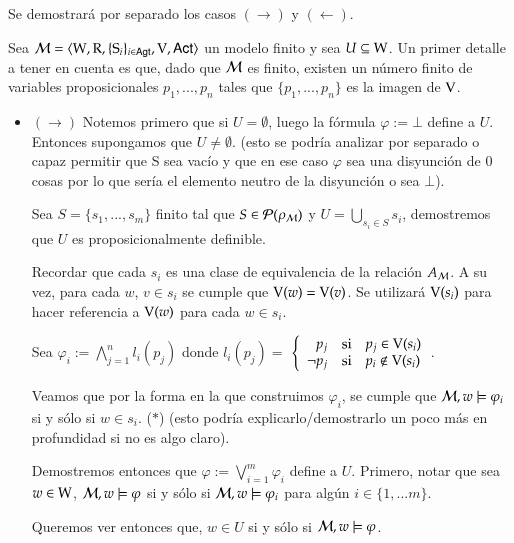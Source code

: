 \begin{demostracion}
    Se demostrará por separado los casos $(\rightarrow)$ y $(\leftarrow)$.

    Sea $\mathcal{M}=\langle \mathrm{W},\mathrm{R},\{ \mathrm{S}_i \}_{i \in {\rm \sf Agt}},\mathrm{V},{\rm \sf Act} \rangle$ un modelo finito y sea $U \subseteq \mathrm{W}$. Un primer detalle a tener en cuenta es que, dado que $\mathcal{M}$ es finito, existen un número finito de variables proposicionales $p_1,...,p_n$ tales que $\{p_1,...,p_n\}$ es la imagen de $\mathrm{V}$.

    \begin{itemize}
        \item $(\rightarrow)$ Notemos primero que si $U = \emptyset$, luego la fórmula $ \varphi := \bot$ define a $U$. Entonces supongamos que $U \neq \emptyset$. (esto se podría analizar por separado o capaz permitir que S sea vacío y que en ese caso $\varphi$ sea una disyunción de 0 cosas por lo que sería el elemento neutro de la disyunción o sea $\bot$).
        
        Sea $S = \{s_1,...,s_m\}$ finito tal que $S \in \mathcal{P}(\rho_{\mathcal{M}})$ y $U = \bigcup\limits_{s_i \in S} s_{i}$, demostremos que $U$ es proposicionalmente definible. 

        Recordar que cada $s_i$ es una clase de equivalencia de la relación $A_{\mathcal{M}}$. A su vez, para cada $w$, $v \in s_i$ se cumple que $\mathrm{V}(w) = \mathrm{V}(v)$. Se utilizará $\mathrm{V}(s_i)$ para hacer referencia a $\mathrm{V}(w)$ para cada $w \in s_i$.

        Sea $\varphi_i := \bigwedge\limits_{j = 1}^{n} l_i(p_j)$ donde $l_i(p_j) = $
        $\left\{ \begin{array}{rcl}
                p_j & \mbox{si}
                & p_j \in \mathrm{V}(s_i) \\ \neg p_j & \mbox{si} & p_i \notin \mathrm{V}(s_i) \\
                \end{array}\right.
        $.

        Veamos que por la forma en la que construimos $\varphi_i$, se cumple que $\mathcal{M}, w \models \varphi_i$ si y sólo si $w \in s_i$. ($*$)
        (esto podría explicarlo/demostrarlo un poco más en profundidad si no es algo claro).
        
        Demostremos entonces que $\varphi := \bigvee\limits_{i = 1}^{m}\varphi_i$ define a $U$. Primero, notar que sea $w \in \mathrm{W}$, $\mathcal{M}, w \models \varphi$ si y sólo si $\mathcal{M}, w \models \varphi_i$ para algún $i \in \{1,...m\}$.  

        Queremos ver entonces que, $w \in U$ si y sólo si $\mathcal{M}, w \models \varphi$. 


\end{itemize}
\end{demostracion}
